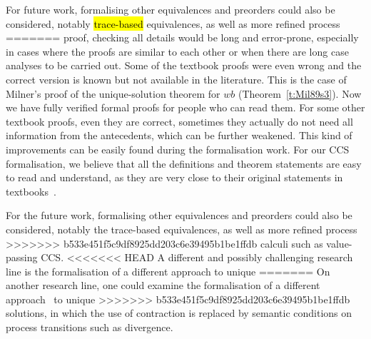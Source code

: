 For  future work, formalising other equivalences and preorders could also be considered,
notably  \hl{trace-based} equivalences, as well as more refined process
=======
proof, checking all details would be long and error-prone,
especially in cases where the proofs are similar to each other or
  when there are long case analyses to be carried out.
Some of the textbook proofs were even wrong and the correct version is
known but not available in the literature. This is the case of Milner's
proof of the unique-solution theorem for $wb$
(Theorem~\ref{t:Mil89s3}). Now we have fully verified formal proofs for
people who can read them.
For some other textbook proofs, even they are correct, sometimes they actually
do not need all information from the antecedents, which can be further
weakened. This kind of improvements can be easily found during the
formalisation work.
For our CCS formalisation, we believe that all the definitions and
theorem statements are easy to read and
understand, as they are very close to their original statements in
textbooks~\cite{Gorrieri:2015jt,Mil89}.

For the future work, formalising other equivalences and preorders could also be considered,
notably the trace-based equivalences, as well as more refined process
>>>>>>> b533e451f5c9df8925dd203c6e39495b1be1ffdb
calculi such as value-passing CCS.
%
<<<<<<< HEAD
A different and possibly challenging  research line is
 the formalisation of a different
approach \cite{DurierHS17,DurierHS18} to unique
=======
On another research line, one could examine the formalisation of a different
approach~\cite{DurierHS17} to unique
>>>>>>> b533e451f5c9df8925dd203c6e39495b1be1ffdb
solutions, in which the use of contraction is
replaced by semantic conditions on process transitions such as
divergence.
%


